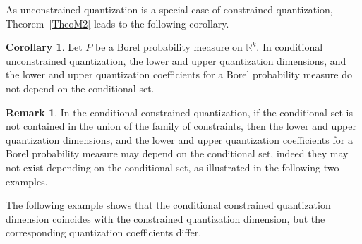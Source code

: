 \documentclass[12pt, reqno]{amsart}
\theoremstyle{plain}
\theoremstyle{definition}
\newtheorem{cor}[subsection]{Corollary}
\newtheorem{remark}[subsection]{Remark}
\newcommand{\D}[1]{\mathbb{#1}}%
\begin{document}
As unconstrained quantization is a special case of constrained quantization, Theorem~\ref{TheoM2} leads to the following corollary. 
\begin{cor}
Let $P$ be a Borel probability measure on $\D R^k$. In conditional unconstrained quantization, the lower and upper quantization dimensions, and the lower and upper quantization coefficients for a Borel probability measure do not depend on the conditional set. 
\end{cor}  



\begin{remark} \label{remM345} 
In the conditional constrained quantization, if the conditional set is not contained in the union of the family of constraints, then the lower and upper quantization dimensions, and the lower and upper quantization coefficients for a Borel probability measure may depend on the conditional set, indeed they may not exist depending on the conditional set,  as illustrated in the following two examples.
\end{remark}
The following example shows that the conditional constrained quantization dimension coincides with the constrained quantization dimension, but the corresponding quantization coefficients differ. 
\end{document}
